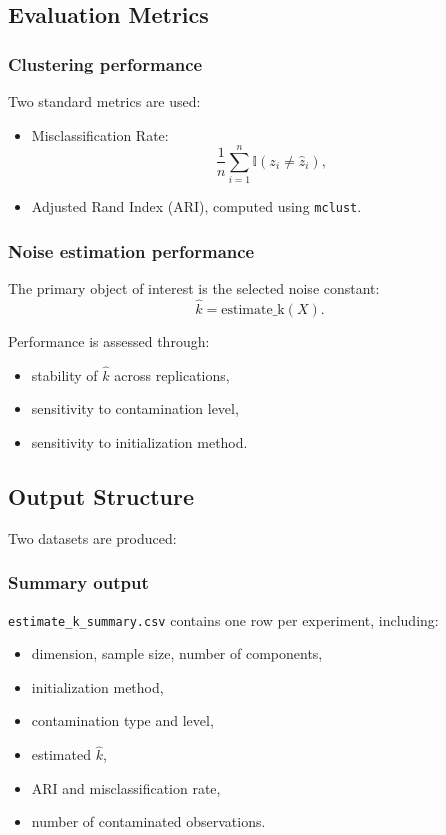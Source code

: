 \documentclass[11pt]{article}
\begin{document}
\subsection{Evaluation Metrics}

\subsubsection{Clustering performance}

Two standard metrics are used:

\begin{itemize}
    \item Misclassification Rate:
    \[
    \frac{1}{n} \sum_{i=1}^{n} \mathbb{I}(z_i \neq \hat{z}_i),
    \]
    \item Adjusted Rand Index (ARI), computed using \texttt{mclust}.
\end{itemize}

\subsubsection{Noise estimation performance}

The primary object of interest is the selected noise constant:
\[
\hat{k} = \text{estimate\_k}(X).
\]

Performance is assessed through:
\begin{itemize}
    \item stability of $\hat{k}$ across replications,
    \item sensitivity to contamination level,
    \item sensitivity to initialization method.
\end{itemize}

\subsection{Output Structure}

Two datasets are produced:

\subsubsection{Summary output}

\texttt{estimate\_k\_summary.csv} contains one row per experiment, including:
\begin{itemize}
    \item dimension, sample size, number of components,
    \item initialization method,
    \item contamination type and level,
    \item estimated $\hat{k}$,
    \item ARI and misclassification rate,
    \item number of contaminated observations.
\end{itemize}
\end{document}
